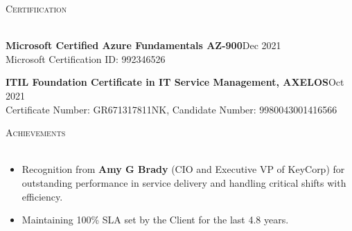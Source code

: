 \documentclass[a4paper]{article}
\newcommand{\lineunder} {
    \vspace*{-8pt} \\
    \hspace*{-18pt} \hrulefill \\
}
\newcommand{\header} [1] {
    {\hspace*{-18pt}\vspace*{6pt} \textsc{#1}}
    \vspace*{-6pt} \lineunder
}
\begin{document}
{\color{blue}\header{Certifiication}}
\vspace{1mm}
\item \textbf{Microsoft Certified Azure Fundamentals AZ-900}\hfill Dec 2021\\
Microsoft Certification ID: 992346526\\
\item \textbf{ITIL Foundation Certificate in IT Service Management, AXELOS}\hfill Oct 2021\\
Certificate Number: GR671317811NK, Candidate Number: 9980043001416566\\
\vspace{2mm}

{\color{blue}\header{Achievements}}
\vspace{1mm}
\justify
\begin{itemize} \itemsep 1pt
           \item Recognition from \textbf{Amy G Brady} (CIO and Executive VP of KeyCorp) for outstanding performance in service delivery and handling critical shifts with efficiency. \\
           \item Maintaining 100\%  SLA set by the Client for the last 4.8 years.
\end{itemize}
\vspace{2mm}
\end{document}
